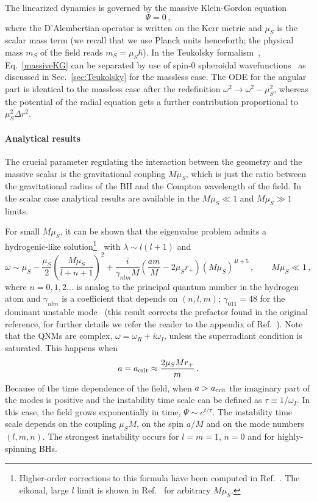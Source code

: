 \documentclass[11pt]{article}
\numberwithin{equation}{section} %
\begin{document}
The linearized dynamics is governed by the massive Klein-Gordon equation
\begin{equation}
 [\square-\mu_S^2]\Psi=0\,, \label{massiveKG}
\end{equation}
where the D'Alembertian operator is written on the Kerr metric and $\mu_S$ is the scalar mass term (we recall that we use Planck units henceforth; the physical mass $m_S$ of the field reads $m_S=\mu_S \hbar$). In the Teukolsky formalism~\cite{Teukolsky:1972my,Teukolsky:1973ha}, Eq.~\eqref{massiveKG} can be separated by use of spin-0 spheroidal wavefunctions~\cite{Berti:2005gp} as discussed in Sec.~\ref{sec:Teukolsky} for the massless case. 
The ODE for the angular part is identical to the massless case after the redefinition $\omega^2\to\omega^2-\mu_S^2$, whereas the potential of the radial equation gets a further contribution proportional to $\mu_S^2 \Delta  r^2$.
\paragraph{Analytical results}
The crucial parameter regulating the interaction between the geometry and the massive scalar is the gravitational coupling $M\mu_S$, which is just the ratio between the gravitational radius of the BH and the Compton wavelength of the field. In the scalar case analytical results are available in the $M\mu_S\ll1$ and $M\mu_S\gg1$ limits.

For small $M\mu_S$, it can be shown that the eigenvalue problem
admits a hydrogenic-like solution\footnote{Higher-order 
corrections to this formula have been computed in 
Ref.~\cite{Baumann:2018vus}. The eikonal, large $l$ limit is shown in Ref.~\cite{Eperon:2019viw} for arbitrary $M\mu_S$.}~\cite{Detweiler:1980uk,Rosa:2009ei,Pani:2012bp} with $\lambda\sim l(l+1)$ and
%
\begin{equation}
\label{omegaDetweiler}
\omega\sim \mu_S-\frac{\mu_S}{2}\left(\frac{M\mu_S}{l+n+1}\right)^2+\frac{i}{\gamma_{nlm}M}\left(\frac{am}{M}-2\mu_S 
r_+\right)(M\mu_S)^{4l+5}\,, \qquad M\mu_S\ll1\,,
\end{equation}
%
where $n=0,1,2...$ is analog to the principal quantum number in the hydrogen atom and $\gamma_{nlm}$ is a coefficient that depends on $(n,l,m)$; $\gamma_{011}=48$ for the dominant unstable mode~\cite{Pani:2012bp} (this result corrects the prefactor found in the original reference, for further details we refer the reader to the appendix of Ref.~\cite{Pani:2012bp}). Note that the QNMs are complex, $\omega=\omega_R+i\omega_I$, unless the superradiant condition is saturated. This happens when 
\begin{equation}
 a=a_{\rm crit}\approx \frac{2\mu_S M r_+}{m}\,.\label{acrit}
\end{equation}
Because of the time dependence of the field, when $a>a_{\rm crit}$ the imaginary part of the modes is positive and the instability time scale can be defined as $\tau\equiv1/\omega_I$. In this case, the field grows exponentially in time, $\Psi\sim e^{t/\tau}$. The instability time scale depends on the coupling $\mu_S M$, on the spin $a/M$ and on the mode numbers $(l,m,n)$. The strongest instability occurs for $l=m=1$, $n=0$ and for highly-spinning BHs. 
\end{document}
